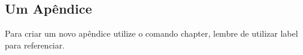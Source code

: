 \begin{apendicesenv}
  \partapendices  %

  \chapter{Um Apêndice}
  \label{ape:apendice1}
  Para criar um novo apêndice utilize o comando chapter, lembre de utilizar label para referenciar.

\end{apendicesenv}
